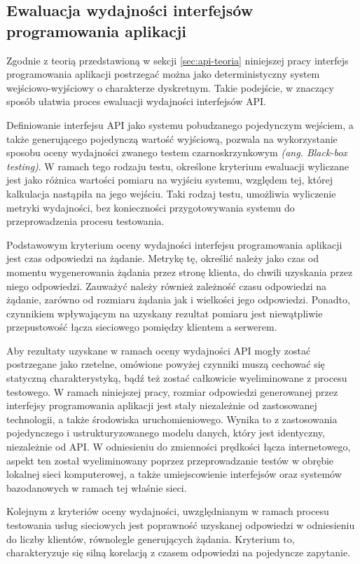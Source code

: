 \subsection*{Ewaluacja wydajności interfejsów programowania aplikacji}
Zgodnie z teorią przedstawioną w sekcji \ref{sec:api-teoria} niniejszej pracy interfejs programowania aplikacji postrzegać można jako deterministyczny system wejściowo-wyjściowy o charakterze dyskretnym. Takie podejście, w znaczący sposób ułatwia proces ewaluacji wydajności interfejsów API.

Definiowanie interfejsu API jako systemu pobudzanego pojedynczym wejściem, a także generującego pojedynczą wartość wyjściową, pozwala na wykorzystanie sposobu oceny wydajności zwanego testem czarnoskrzynkowym \textit{(ang. Black-box testing)}. W ramach tego rodzaju testu, określone kryterium ewaluacji wyliczane jest jako różnica wartości pomiaru na wyjściu systemu, względem tej, której kalkulacja nastąpiła na jego wejściu. Taki rodzaj testu, umożliwia wyliczenie metryki wydajności, bez konieczności przygotowywania systemu do przeprowadzenia procesu testowania.

Podstawowym kryterium oceny wydajności interfejsu programowania aplikacji jest czas odpowiedzi na żądanie. Metrykę tę, określić należy jako czas od momentu wygenerowania żądania przez stronę klienta, do chwili uzyskania przez niego odpowiedzi. Zauważyć należy również zależność czasu odpowiedzi na żądanie, zarówno od rozmiaru żądania jak i wielkości jego odpowiedzi. Ponadto, czynnikiem wpływającym na uzyskany rezultat pomiaru jest niewątpliwie przepustowość łącza sieciowego pomiędzy klientem a serwerem.

Aby rezultaty uzyskane w ramach oceny wydajności API mogły zostać postrzegane jako rzetelne, omówione powyżej czynniki muszą cechować się statyczną charakterystyką, bądź też zostać całkowicie wyeliminowane z procesu testowego. W ramach niniejszej pracy, rozmiar odpowiedzi generowanej przez interfejsy programowania aplikacji jest stały niezależnie od zastosowanej technologii, a także środowiska uruchomieniowego. Wynika to z zastosowania pojedynczego i ustrukturyzowanego modelu danych, który jest identyczny, niezależnie od API. W odniesieniu do zmienności prędkości łącza internetowego, aspekt ten został wyeliminowany poprzez przeprowadzanie testów w obrębie lokalnej sieci komputerowej, a także umiejscowienie interfejsów oraz systemów bazodanowych w ramach tej właśnie sieci.

Kolejnym z kryteriów oceny wydajności, uwzględnianym w ramach procesu testowania usług sieciowych jest poprawność uzyskanej odpowiedzi w odniesieniu do liczby klientów, równolegle generujących żądania. Kryterium to, charakteryzuje się silną korelacją z czasem odpowiedzi na pojedyncze zapytanie.


